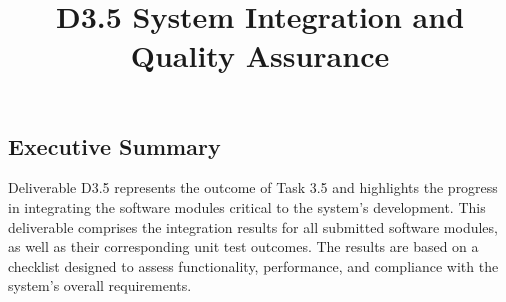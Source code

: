 \documentclass{CSSRforAfrica}
\begin{document}



\title{D3.5 System Integration and Quality Assurance}

\partner{}                          




\maketitle
 

\subsection*{Executive Summary}
\label{executive_summary}



\noindent Deliverable D3.5 represents the outcome of Task 3.5 and highlights the progress in integrating the software modules critical to the system's development. This deliverable comprises the integration results for all submitted software modules, as well as their corresponding unit test outcomes. The results are based on a checklist designed to assess functionality, performance, and compliance with the system's overall requirements.

\end{document}

